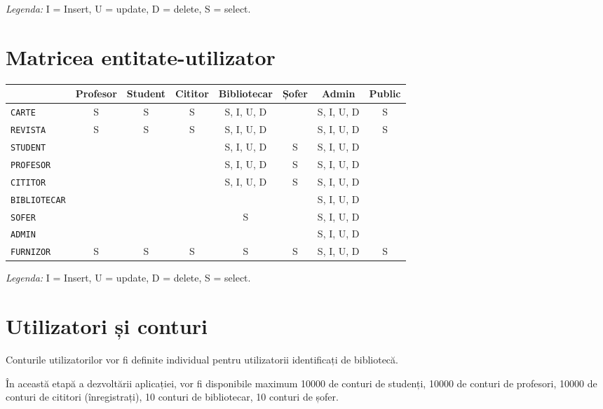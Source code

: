 \emph{Legenda:} I = Insert, U = update, D = delete, S = select.


\section{Matricea entitate-utilizator}
\label{sec:matr-eu}

\begin{center}
  \small
  \begin{tabular}{|l|c|c|c|c|c|c|c|}
    \hline
    & Profesor & Student & Cititor & Bibliotecar & Șofer & Admin & Public \\
    \hline\hline
    \texttt{CARTE} & S & S & S & S, I, U, D & & S, I, U, D & S \\
    \hline
    \texttt{REVISTA} & S & S & S & S, I, U, D & & S, I, U, D & S \\
    \hline
    \texttt{STUDENT} & & & & S, I, U, D & S & S, I, U, D & \\
    \hline
    \texttt{PROFESOR} & & & & S, I, U, D & S & S, I, U, D & \\
    \hline
    \texttt{CITITOR} & & & & S, I, U, D & S & S, I, U, D & \\
    \hline
    \texttt{BIBLIOTECAR} & & & & & & S, I, U, D & \\
    \hline
    \texttt{SOFER} & & & & S & & S, I, U, D & \\
    \hline
    \texttt{ADMIN} & & & & & & S, I, U, D & \\
    \hline
    \texttt{FURNIZOR} & S & S & S & S & S & S, I, U, D & S \\
    \hline
  \end{tabular}
\end{center}

\emph{Legenda:} I = Insert, U = update, D = delete, S = select.


\section{Utilizatori și conturi}
\label{sec:ut-cont}

Conturile utilizatorilor vor fi definite individual pentru utilizatorii
identificați de bibliotecă.

În această etapă a dezvoltării aplicației, vor fi disponibile maximum
10000 de conturi de studenți, 10000 de conturi de profesori, 10000 de
conturi de cititori (înregistrați), 10 conturi de bibliotecar,
10 conturi de șofer.


